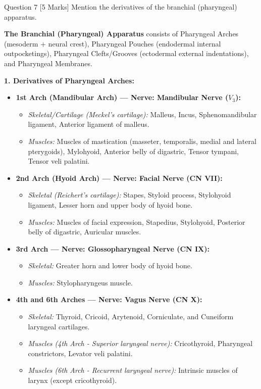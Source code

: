 \documentclass[11pt,a4paper]{article}
\begin{document}
\begin{qbox}{Question 7 [5 Marks]}
Mention the derivatives of the branchial (pharyngeal) apparatus.
\end{qbox}

\begin{ansbox}
\textbf{The Branchial (Pharyngeal) Apparatus} consists of Pharyngeal Arches (mesoderm + neural crest), Pharyngeal Pouches (endodermal internal outpocketings), Pharyngeal Clefts/Grooves (ectodermal external indentations), and Pharyngeal Membranes.

\textbf{1. Derivatives of Pharyngeal Arches:}
\begin{itemize}[leftmargin=*]
    \item \textbf{1st Arch (Mandibular Arch) --- Nerve: Mandibular Nerve ($V_3$):}
    \begin{itemize}
        \item \textit{Skeletal/Cartilage (Meckel's cartilage):} Malleus, Incus, Sphenomandibular ligament, Anterior ligament of malleus.
        \item \textit{Muscles:} Muscles of mastication (masseter, temporalis, medial and lateral pterygoids), Mylohyoid, Anterior belly of digastric, Tensor tympani, Tensor veli palatini.
    \end{itemize}
    \item \textbf{2nd Arch (Hyoid Arch) --- Nerve: Facial Nerve (CN VII):}
    \begin{itemize}
        \item \textit{Skeletal (Reichert's cartilage):} Stapes, Styloid process, Stylohyoid ligament, Lesser horn and upper body of hyoid bone.
        \item \textit{Muscles:} Muscles of facial expression, Stapedius, Stylohyoid, Posterior belly of digastric, Auricular muscles.
    \end{itemize}
    \item \textbf{3rd Arch --- Nerve: Glossopharyngeal Nerve (CN IX):}
    \begin{itemize}
        \item \textit{Skeletal:} Greater horn and lower body of hyoid bone.
        \item \textit{Muscles:} Stylopharyngeus muscle.
    \end{itemize}
    \item \textbf{4th and 6th Arches --- Nerve: Vagus Nerve (CN X):}
    \begin{itemize}
        \item \textit{Skeletal:} Thyroid, Cricoid, Arytenoid, Corniculate, and Cuneiform laryngeal cartilages.
        \item \textit{Muscles (4th Arch - Superior laryngeal nerve):} Cricothyroid, Pharyngeal constrictors, Levator veli palatini.
        \item \textit{Muscles (6th Arch - Recurrent laryngeal nerve):} Intrinsic muscles of larynx (except cricothyroid).
    \end{itemize}
\end{itemize}


\end{ansbox}
\end{document}
